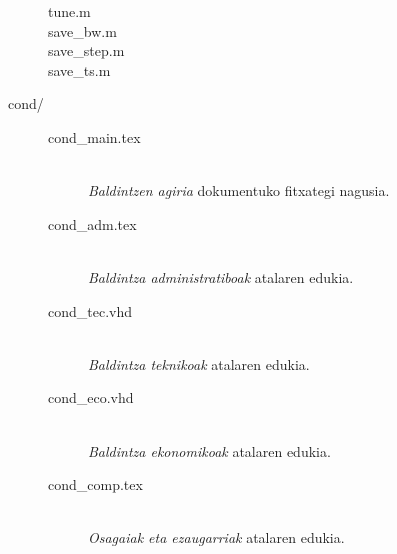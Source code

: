 \begin{description}
{\begin{description}
{    \begin{description}
     \item[tune.m]{}
     \item[save\_bw.m]{}
     \item[save\_step.m]{}
     \item[save\_ts.m]{}
    \end{description}   
   }
  \end{description}
 }
 \item[cond/]{\hfill

  \begin{description}
   \item[cond\_main.tex]{\hfill\\\emph{Baldintzen agiria} dokumentuko fitxategi nagusia.}
   \item[cond\_adm.tex]{\hfill\\\emph{Baldintza administratiboak} atalaren edukia.}
   \item[cond\_tec.vhd]{\hfill\\\emph{Baldintza teknikoak} atalaren edukia.}
   \item[cond\_eco.vhd]{\hfill\\\emph{Baldintza ekonomikoak} atalaren edukia.}
   \item[cond\_comp.tex]{\hfill\\\emph{Osagaiak eta ezaugarriak} atalaren edukia.}
  \end{description} 
 }
\end{description}
